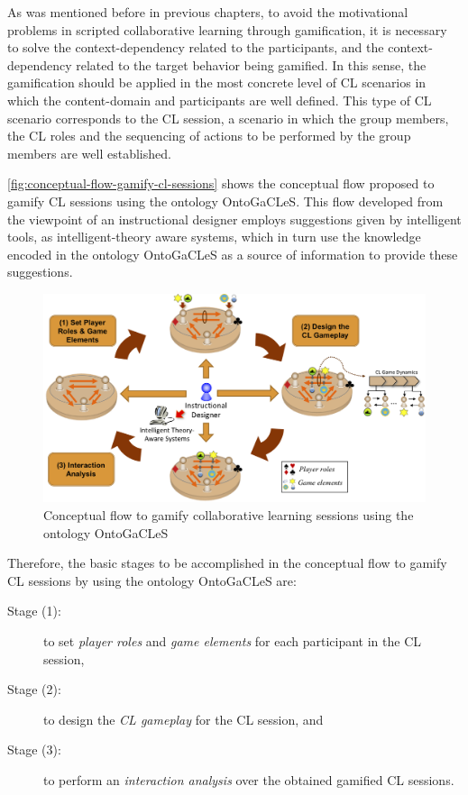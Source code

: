 As was mentioned before in previous chapters, to avoid the motivational problems in scripted collaborative learning through gamification, it is necessary to solve the context-dependency related to the participants, and the context-dependency related to the target behavior being gamified.
In this sense, the gamification should be applied in the most concrete level of CL scenarios in which the content-domain and participants are well defined.
This type of CL scenario corresponds to the CL session, a scenario in which the group members, the CL roles and the sequencing of actions to be performed by the group members are well established.

\autoref{fig:conceptual-flow-gamify-cl-sessions} shows the conceptual flow proposed to gamify CL sessions using the ontology OntoGaCLeS.
This flow developed from the viewpoint of an instructional designer employs suggestions given by intelligent tools, as intelligent-theory aware systems, which in turn use the knowledge encoded in the ontology OntoGaCLeS as a source of information to provide these suggestions.

\begin{figure}[htb]
  \caption{Conceptual flow to gamify collaborative learning sessions using the ontology OntoGaCLeS}
  \label{fig:conceptual-flow-gamify-cl-sessions}
  \centering
  \includegraphics[width=1\textwidth]{images/chap-mechanisms-procedures/conceptual-flow-gamify-cl-sessions.png}
  \fautor
\end{figure}

Therefore, the basic stages to be accomplished in the conceptual flow to gamify CL sessions by using the ontology OntoGaCLeS are:

\begin{description}
\item[Stage (1):] to set \emph{player roles} and \emph{game elements} for each participant in the CL session,
\item[Stage (2):] to design the \emph{CL gameplay} for the CL session, and
\item[Stage (3):] to perform an \emph{interaction analysis} over the obtained gamified CL sessions.
\end{description}

